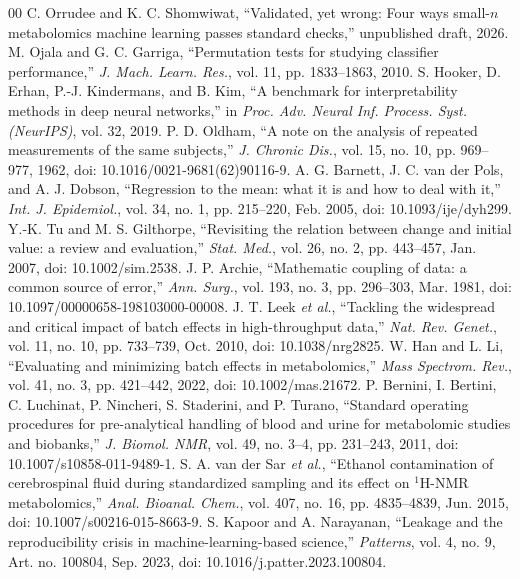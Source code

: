 \documentclass[conference]{IEEEtran}
\begin{document}
\begin{thebibliography}{00}
 C. Orrudee and K. C. Shomwiwat, ``Validated, yet wrong: Four ways small-$n$ metabolomics machine learning passes standard checks,'' unpublished draft, 2026.
 M. Ojala and G. C. Garriga, ``Permutation tests for studying classifier performance,'' \textit{J. Mach. Learn. Res.}, vol. 11, pp. 1833--1863, 2010.
 S. Hooker, D. Erhan, P.-J. Kindermans, and B. Kim, ``A benchmark for interpretability methods in deep neural networks,'' in \textit{Proc. Adv. Neural Inf. Process. Syst. (NeurIPS)}, vol. 32, 2019.
 P. D. Oldham, ``A note on the analysis of repeated measurements of the same subjects,'' \textit{J. Chronic Dis.}, vol. 15, no. 10, pp. 969--977, 1962, doi: 10.1016/0021-9681(62)90116-9.
 A. G. Barnett, J. C. van der Pols, and A. J. Dobson, ``Regression to the mean: what it is and how to deal with it,'' \textit{Int. J. Epidemiol.}, vol. 34, no. 1, pp. 215--220, Feb. 2005, doi: 10.1093/ije/dyh299.
 Y.-K. Tu and M. S. Gilthorpe, ``Revisiting the relation between change and initial value: a review and evaluation,'' \textit{Stat. Med.}, vol. 26, no. 2, pp. 443--457, Jan. 2007, doi: 10.1002/sim.2538.
 J. P. Archie, ``Mathematic coupling of data: a common source of error,'' \textit{Ann. Surg.}, vol. 193, no. 3, pp. 296--303, Mar. 1981, doi: 10.1097/00000658-198103000-00008.
 J. T. Leek \textit{et al.}, ``Tackling the widespread and critical impact of batch effects in high-throughput data,'' \textit{Nat. Rev. Genet.}, vol. 11, no. 10, pp. 733--739, Oct. 2010, doi: 10.1038/nrg2825.
 W. Han and L. Li, ``Evaluating and minimizing batch effects in metabolomics,'' \textit{Mass Spectrom. Rev.}, vol. 41, no. 3, pp. 421--442, 2022, doi: 10.1002/mas.21672.
 P. Bernini, I. Bertini, C. Luchinat, P. Nincheri, S. Staderini, and P. Turano, ``Standard operating procedures for pre-analytical handling of blood and urine for metabolomic studies and biobanks,'' \textit{J. Biomol. NMR}, vol. 49, no. 3--4, pp. 231--243, 2011, doi: 10.1007/s10858-011-9489-1.
 S. A. van der Sar \textit{et al.}, ``Ethanol contamination of cerebrospinal fluid during standardized sampling and its effect on $^1$H-NMR metabolomics,'' \textit{Anal. Bioanal. Chem.}, vol. 407, no. 16, pp. 4835--4839, Jun. 2015, doi: 10.1007/s00216-015-8663-9.
 S. Kapoor and A. Narayanan, ``Leakage and the reproducibility crisis in machine-learning-based science,'' \textit{Patterns}, vol. 4, no. 9, Art. no. 100804, Sep. 2023, doi: 10.1016/j.patter.2023.100804.

\end{thebibliography}
\end{document}
